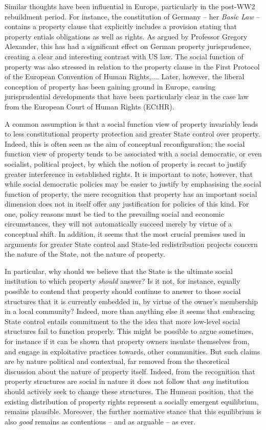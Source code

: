 Similar thoughts have been influential in Europe, particularly in the post-WW2 rebuildment period. For instance, the constitution of Germany -- her {\it Basic Law} -- contains a property clause that explicitly includes a provision stating that property entials obligations as well as rights. As argued by Professor Gregory Alexander, this has had a significant effect on German property jurisprudence, creating a clear and interesting contrast with US law. The social function of property was also stressed in relation to the property clause in the First Protocol of the European Convention of Human Rights,.... Later, however, the liberal conception of property has been gaining ground in Europe, causing jurisprudential developments that have been particularly clear in the case law from the European Court of Human Rights (ECtHR).

A common assumption is that a social function view of property invariably leads to less constitutional property protection and greater State control over property. Indeed, this is often seen as the aim of conceptual reconfiguration; the social function view of property tends to be associated with a social democratic, or even socialist, political project, by which the notion of property is recast to justify greater interference in established rights. It is important to note, however, that while social democratic policies may be easier to justify by emphasising the social function of property, the mere recognition that property has an important social dimension does not in itself offer any justification for policies of this kind. For one, policy reasons must be tied to the prevailing social and economic circumstances, they will not automatically succeed merely by virtue of a conceptual shift. In addition, it seems that the most crucial premises used in arguments for greater State control and State-led redistribution projects concern the nature of the State, not the nature of property.

In particular, why should we believe that the State is the ultimate social institution to which property {\it should} answer? Is it not, for instance, equally possible to contend that property should continue to answer to those social structures that it is currently embedded in, by virtue of the owner's membership in a local community? Indeed, more than anything else it seems that embracing State control entails commitment to the the idea that more low-level social structures fail to function properly. This might be possible to argue sometimes, for instance if it can be shown that property owners insulate themselves from, and engage in exploitative practices towards, other communities. But such claims are by nature political and contextual, far removed from the theoretical discussion about the nature of property itself. Indeed, from the recognition that property structures are social in nature it does not follow that {\it any} institution should actively seek to change these structures. The Humean position, that the existing distribution of property rights represent a socially emergent equilibrium, remains plausible. Moreover, the further normative stance that this equilibrium is also {\it good} remains as contentious -- and as arguable -- as ever.

